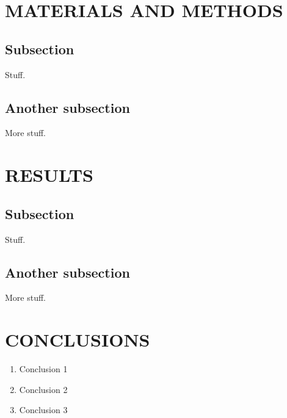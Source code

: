 \documentclass[maize,portrait]{a0poster}
\begin{document}
\begin{multicols}{4}
  \section*{MATERIALS AND METHODS}



  \subsection*{Subsection}

  Stuff.

  \subsection*{Another subsection}

  More stuff.


  \section*{RESULTS}

  \subsection*{Subsection}

  Stuff.

  \subsection*{Another subsection}

  More stuff.
  

  \section*{CONCLUSIONS}
  \color{CarnegiePriBlue}
  
  \begin{enumerate}
  \item Conclusion 1
  \item Conclusion 2
  \item Conclusion 3
  \end{enumerate}


\end{multicols}
\end{document}
